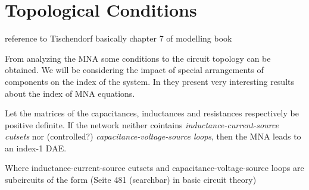 \section{Topological Conditions} 
reference to Tischendorf
basically chapter 7 of modelling book

From analyzing the MNA some conditions to the circuit topology can be obtained. We will be considering the impact of special arrangements of components on the index of the system. In \cite{Tischendorf2005Topological} they present very interesting results about the index of MNA equations.


\begin{theorem} \cite{Tischendorf2005Topological} \label{Index-1 condition}
	Let the matrices of the capacitances, inductances and resistances respectively be positive definite. If the network neither cointains \emph{inductance-current-source cutsets} nor (controlled?) \emph{capacitance-voltage-source loops}, then the MNA leads to an index-1 DAE.
\end{theorem}

Where inductance-current-source cutsets and capacitance-voltage-source loops are subcircuits of the form (Seite 481 (searchbar) in basic circuit theory)

